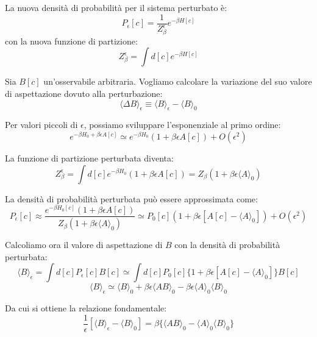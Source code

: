La nuova densità di probabilità per il sistema perturbato è:
\begin{equation}
 P_\epsilon[c] = \frac{1}{Z_\beta^\epsilon} e^{-\beta H[c]}
\end{equation}
con la nuova funzione di partizione:
\begin{equation}
 Z_\beta^\epsilon = \int d[c] e^{-\beta H[c]}
\end{equation}

Sia $B[c]$ un'osservabile arbitraria. Vogliamo calcolare la variazione del suo valore di aspettazione dovuto alla perturbazione:
\begin{equation}
 \langle \Delta B \rangle_\epsilon \equiv \langle B \rangle_\epsilon - \langle B \rangle_0
\end{equation}

Per valori piccoli di $\epsilon$, possiamo sviluppare l'esponenziale al primo ordine:
\begin{equation}
 e^{-\beta H_0 + \beta \epsilon A[c]} \simeq e^{-\beta H_0} (1 + \beta \epsilon A[c]) + O(\epsilon^2)
\end{equation}

La funzione di partizione perturbata diventa:
\begin{equation}
 Z_\beta^\epsilon = \int d[c] e^{-\beta H_0} (1 + \beta \epsilon A[c]) = Z_\beta (1 + \beta \epsilon \langle A \rangle_0)
\end{equation}

La densità di probabilità perturbata può essere approssimata come:
\begin{equation}
 P_\epsilon[c] \approx \frac{e^{-\beta H_0[c]} (1 + \beta \epsilon A[c])}{Z_\beta (1 + \beta \epsilon \langle A \rangle_0)} \simeq P_0[c] (1 + \beta \epsilon [A[c] - \langle A \rangle_0]) + O(\epsilon^2)
\end{equation}

Calcoliamo ora il valore di aspettazione di $B$ con la densità di probabilità perturbata:
\begin{equation}
 \langle B \rangle_\epsilon = \int d[c] P_\epsilon[c] B[c] \simeq \int d[c] P_0[c] \{1 + \beta \epsilon [A[c] - \langle A \rangle_0]\} B[c]
\end{equation}
\begin{equation}
 \langle B \rangle_\epsilon \simeq \langle B \rangle_0 + \beta \epsilon \langle AB \rangle_0 - \beta \epsilon \langle A \rangle_0 \langle B \rangle_0
\end{equation}

Da cui si ottiene la relazione fondamentale:
\begin{equation}
 \frac{1}{\epsilon} [\langle B \rangle_\epsilon - \langle B \rangle_0] = \beta \{ \langle AB \rangle_0 - \langle A \rangle_0 \langle B \rangle_0 \}
\end{equation}

